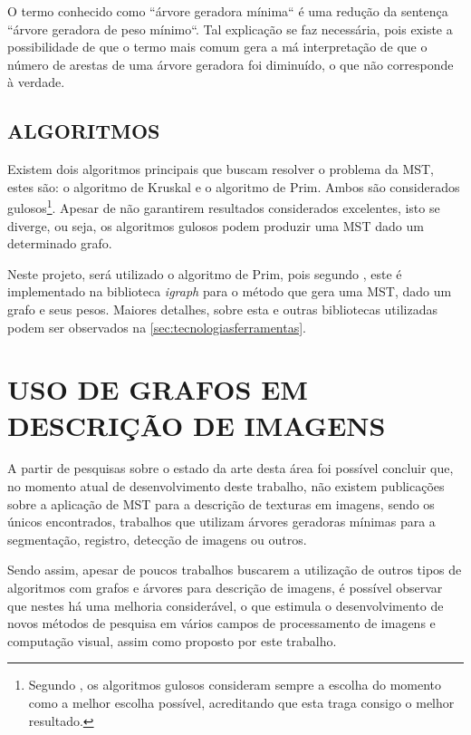 \par O termo conhecido como ``árvore geradora mínima`` é uma redução da sentença ``árvore geradora de peso mínimo``. Tal explicação se faz necessária, pois existe a possibilidade de que o termo mais comum gera a má interpretação de que o número de arestas de uma árvore geradora foi diminuído, o que não corresponde à verdade.

\subsection{ALGORITMOS}
\label{subsec:algoritmosmst}

\par Existem dois algoritmos principais que buscam resolver o problema da MST, estes são: o algoritmo de Kruskal e o algoritmo de Prim. Ambos são considerados gulosos\footnote{Segundo , os algoritmos gulosos consideram sempre a escolha do momento como a melhor escolha possível, acreditando que esta traga consigo o melhor resultado.}. Apesar de não garantirem resultados considerados excelentes, isto se diverge, ou seja, os algoritmos gulosos podem produzir uma MST dado um determinado grafo.
\par Neste projeto, será utilizado o algoritmo de Prim, pois segundo , este é implementado na biblioteca \textit{igraph} para o método que gera uma MST, dado um grafo e seus pesos. Maiores detalhes, sobre esta e outras bibliotecas utilizadas podem ser observados na \autoref{sec:tecnologiasferramentas}.

\section{USO DE GRAFOS EM DESCRIÇÃO DE IMAGENS}
\label{sec:usografosdescimg}

\par A partir de pesquisas sobre o estado da arte desta área foi possível concluir que, no momento atual de desenvolvimento deste trabalho, não existem publicações sobre a aplicação de MST para a descrição de texturas em imagens, sendo os únicos encontrados, trabalhos que utilizam árvores geradoras mínimas para a segmentação, registro, detecção de imagens ou outros.

\par Sendo assim, apesar de poucos trabalhos buscarem a utilização de outros tipos de algoritmos com grafos e árvores para descrição de imagens, é possível observar que nestes há uma melhoria considerável, o que estimula o desenvolvimento de novos métodos de pesquisa em vários campos de processamento de imagens e computação visual, assim como proposto por este trabalho.

